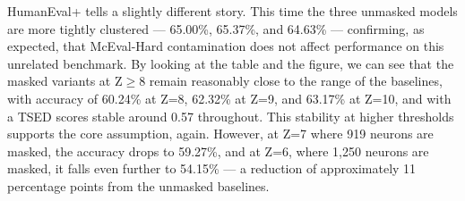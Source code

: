 \documentclass[mscthesis]{usiinfthesis}
\begin{document}
\begin{table}[h]
\centering
\caption{Accuracy and TSED on HumanEval+ for baseline models and masked variants.}
\label{tab:humaneval_robustness}
\end{table}

HumanEval+ tells a slightly different story.
This time the three unmasked models are more tightly clustered --- 65.00\%, 65.37\%, and 64.63\% --- 
confirming, as expected, that McEval-Hard contamination does not affect performance on this unrelated benchmark.
By looking at the table and the figure, we can see that the masked variants at Z$\geq$8 remain reasonably close to the range of the baselines, with accuracy of 60.24\% at Z=8, 62.32\% at Z=9, and 63.17\% at Z=10, and with a TSED scores stable around 0.57 throughout.
This stability at higher thresholds supports the core assumption, again. 
However, at Z=7 where 919 neurons are masked, the accuracy drops to 59.27\%, and at Z=6, where 1,250 neurons are masked, it falls even further to
54.15\% --- a reduction of approximately 11 percentage points from the unmasked
baselines. 

\end{document}
